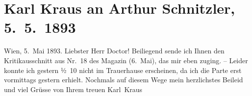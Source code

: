 

         
         \newcommand{\erwaehntePersonen}{Personen: Johann Schnitzler}
         \newcommand{\erwaehnteOrte}{Orte: Burgring, Wien}
         \newcommand{\erwaehnteWerke}{Werke: Magazin für die Literatur des Auslandes, Wiener Dichter}
               \section[Karl Kraus an Arthur Schnitzler, 5. 5. 1893]{ Karl Kraus an Arthur Schnitzler, 5. 5. 1893}\nopagebreak{}\rehead{ }\begin{ledgroupsized}[t]{13cm}\normalsize\beginnumbering \toendnotes[C]{\smallbreak\pagebreak[2]} 
\toendnotes[C]{\smallbreak}\pstart
           \raggedleft{}{\pb}Wien, 5. Mai 1893. \pend
           \pstart
           Liebster Herr Doctor! Beiliegend sende ich Ihnen den Kritikausschnitt aus Nr. 18
                    des Magazin (6. Mai), das mir
                    eben zuging. – Leider konnte ich gestern{ }½ 10 nicht im Trauerhause erscheinen, da ich die Parte erst vormit{\pb}tags
                    gestern erhielt. Nochmals auf diesem Wege mein herzlichstes Beileid und viel Grüsse von Ihrem\pend
           \pstart treuen \spacefill\mbox{Karl Kraus}\pend{}
         
         \endnumbering{}\end{ledgroupsized}  \newcommand{\dateiname}{L00212}\newcommand{\titel}{Karl Kraus an Arthur Schnitzler, 5. 5. 1893}\newcommand{\editorInnen}{Martin Anton Müller und Gerd-Hermann Susen}
      